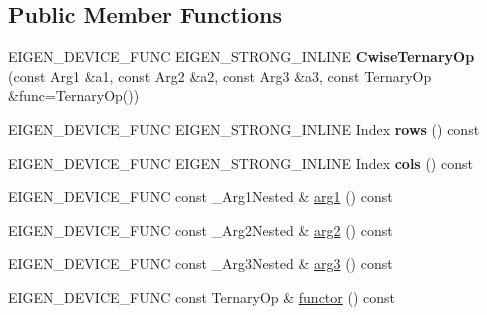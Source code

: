 \subsection*{Public Member Functions}
\begin{DoxyCompactItemize}
\item 
\mbox{\label{class_eigen_1_1_cwise_ternary_op_ac64f71c7d7630c6d16c0e767d1651012}} 
E\+I\+G\+E\+N\+\_\+\+D\+E\+V\+I\+C\+E\+\_\+\+F\+U\+NC E\+I\+G\+E\+N\+\_\+\+S\+T\+R\+O\+N\+G\+\_\+\+I\+N\+L\+I\+NE {\bfseries Cwise\+Ternary\+Op} (const Arg1 \&a1, const Arg2 \&a2, const Arg3 \&a3, const Ternary\+Op \&func=Ternary\+Op())
\item 
\mbox{\label{class_eigen_1_1_cwise_ternary_op_a44c041d7333ce3516c298d1bb0bd9b70}} 
E\+I\+G\+E\+N\+\_\+\+D\+E\+V\+I\+C\+E\+\_\+\+F\+U\+NC E\+I\+G\+E\+N\+\_\+\+S\+T\+R\+O\+N\+G\+\_\+\+I\+N\+L\+I\+NE Index {\bfseries rows} () const
\item 
\mbox{\label{class_eigen_1_1_cwise_ternary_op_ac0a585377faac0ab8b756dfe758477cc}} 
E\+I\+G\+E\+N\+\_\+\+D\+E\+V\+I\+C\+E\+\_\+\+F\+U\+NC E\+I\+G\+E\+N\+\_\+\+S\+T\+R\+O\+N\+G\+\_\+\+I\+N\+L\+I\+NE Index {\bfseries cols} () const
\item 
E\+I\+G\+E\+N\+\_\+\+D\+E\+V\+I\+C\+E\+\_\+\+F\+U\+NC const \+\_\+\+Arg1\+Nested \& \mbox{\hyperlink{class_eigen_1_1_cwise_ternary_op_a37ec6f7c9b863f58a3e193cac44bdd82}{arg1}} () const
\item 
E\+I\+G\+E\+N\+\_\+\+D\+E\+V\+I\+C\+E\+\_\+\+F\+U\+NC const \+\_\+\+Arg2\+Nested \& \mbox{\hyperlink{class_eigen_1_1_cwise_ternary_op_a271606675838696dd7660d4d847ae5f7}{arg2}} () const
\item 
E\+I\+G\+E\+N\+\_\+\+D\+E\+V\+I\+C\+E\+\_\+\+F\+U\+NC const \+\_\+\+Arg3\+Nested \& \mbox{\hyperlink{class_eigen_1_1_cwise_ternary_op_aab71f401afd7ebc25428369c30151a1f}{arg3}} () const
\item 
E\+I\+G\+E\+N\+\_\+\+D\+E\+V\+I\+C\+E\+\_\+\+F\+U\+NC const Ternary\+Op \& \mbox{\hyperlink{class_eigen_1_1_cwise_ternary_op_acec526305dd83e6c0b3bd2cdbfd19307}{functor}} () const
\end{DoxyCompactItemize}
